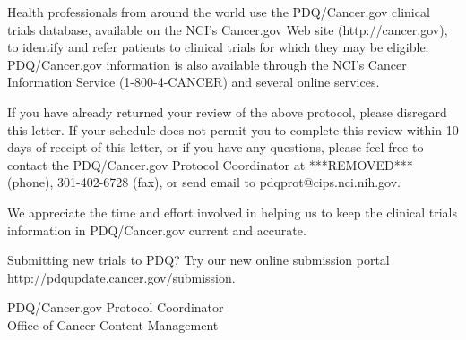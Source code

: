 \documentclass[letterpaper,12pt]{letter}
\begin{document}
Health professionals from around the world use the PDQ/Cancer.gov clinical
trials database, available on the NCI's Cancer.gov Web site
(http://cancer.gov), to identify and refer patients to clinical trials for
which they may be eligible.  PDQ/Cancer.gov information is
also available through the NCI's Cancer Information Service (1-800-4-CANCER)
and several online services.

If you have already returned your review of the above protocol, please
disregard this letter.  If your schedule does not permit you to complete this
review within 10 days of receipt of this letter, or if you have any questions,
please feel free to contact the PDQ/Cancer.gov Protocol
Coordinator at ***REMOVED*** (phone), 301-402-6728 (fax), or send email to 
pdqprot@cips.nci.nih.gov.

We appreciate the time and effort involved in helping us to keep the clinical
trials information in PDQ/Cancer.gov current and accurate.

Submitting new trials to PDQ?
Try our new online submission portal
http://pdqupdate.cancer.gov/submission.

\vspace{12pt}

PDQ/Cancer.gov Protocol Coordinator \\
Office of Cancer Content Management

\vfill
\end{document}
